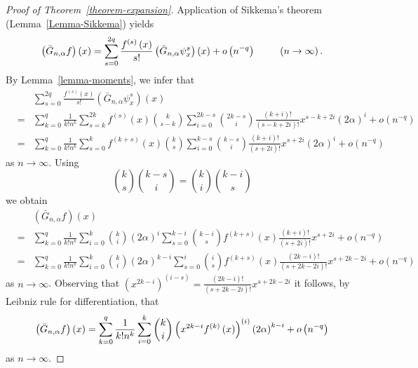 \documentclass[11pt,a4paper]{article}
\begin{document}
\begin{proof}[Proof of Theorem~\protect\ref{theorem-expansion}]
Application of Sikkema's theorem (Lemma~\ref{Lemma-Sikkema}) yields 
\begin{equation*}
\left( \bar{G}_{n,\alpha }f\right) \left( x\right) =\sum_{s=0}^{2q}\frac{%
f^{\left( s\right) }\left( x\right) }{s!}\left( \bar{G}_{n,\alpha }\psi
_{x}^{s}\right) \left( x\right) +o\left( n^{-q}\right) \text{ }\qquad \left(
n\rightarrow \infty \right) .
\end{equation*}%
By Lemma~\ref{lemma-moments}, we infer that 
\begin{eqnarray*}
&&\sum_{s=0}^{2q}\frac{f^{\left( s\right) }\left( x\right) }{s!}\left( \bar{G%
}_{n,\alpha }\psi _{x}^{s}\right) \left( x\right)  \\
&=&\sum_{k=0}^{q}\frac{1}{k!n^{k}}\sum_{s=k}^{2k}f^{\left( s\right) }\left(
x\right) \binom{k}{s-k}\sum_{i=0}^{2k-s}\binom{2k-s}{i}\frac{\left(
k+i\right) !}{\left( s-k+2i\right) !}x^{s-k+2i}\left( 2\alpha \right)
^{i}+o\left( n^{-q}\right)  \\
&=&\sum_{k=0}^{q}\frac{1}{k!n^{k}}\sum_{s=0}^{k}f^{\left( k+s\right) }\left(
x\right) \binom{k}{s}\sum_{i=0}^{k-s}\binom{k-s}{i}\frac{\left( k+i\right) !%
}{\left( s+2i\right) !}x^{s+2i}\left( 2\alpha \right) ^{i}+o\left(
n^{-q}\right) 
\end{eqnarray*}%
as $n\rightarrow \infty $. Using 
\begin{equation*}
\binom{k}{s}\binom{k-s}{i}=\binom{k}{i}\binom{k-i}{s}
\end{equation*}%
we obtain 
\begin{eqnarray*}
&&\left( \bar{G}_{n,\alpha }f\right) \left( x\right)  \\
&=&\sum_{k=0}^{q}\frac{1}{k!n^{k}}\sum_{i=0}^{k}\binom{k}{i}\left( 2\alpha
\right) ^{i}\sum_{s=0}^{k-i}\binom{k-i}{s}f^{\left( k+s\right) }\left(
x\right) \frac{\left( k+i\right) !}{\left( s+2i\right) !}x^{s+2i}+o\left(
n^{-q}\right)  \\
&=&\sum_{k=0}^{q}\frac{1}{k!n^{k}}\sum_{i=0}^{k}\binom{k}{i}\left( 2\alpha
\right) ^{k-i}\sum_{s=0}^{i}\binom{i}{s}f^{\left( k+s\right) }\left(
x\right) \frac{\left( 2k-i\right) !}{\left( s+2k-2i\right) !}%
x^{s+2k-2i}+o\left( n^{-q}\right) 
\end{eqnarray*}%
as $n\rightarrow \infty $. Observing that $\left( x^{2k-i}\right) ^{\left(
i-s\right) }=\frac{\left( 2k-i\right) !}{\left( s+2k-2i\right) !}x^{s+2k-2i}$
it follows, by Leibniz rule for differentiation, that 
\begin{equation*}
\left( \bar{G}_{n,\alpha }f\right) \left( x\right) =\sum_{k=0}^{q}\frac{1}{%
k!n^{k}}\sum_{i=0}^{k}\binom{k}{i}\left( x^{2k-i}f^{\left( k\right) }\left(
x\right) \right) ^{\left( i\right) }\left( 2\alpha \right) ^{k-i}+o\left(
n^{-q}\right) 
\end{equation*}%
as $n\rightarrow \infty $. 
\end{proof}
\end{document}
